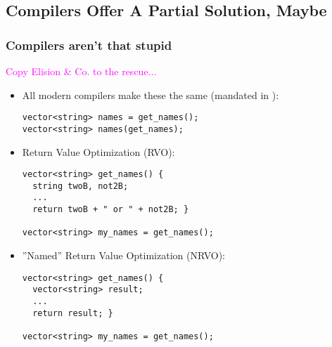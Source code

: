 
\subsection[Compiler != Solution]{Compilers Offer A Partial Solution, Maybe}\lyxframeend{}


\begin{frame}[fragile,t]
\frametitle{Compilers aren't that stupid}

{\textcolor{magenta}{Copy Elision \& Co. to the rescue...}}

\begin{itemize}
\item<2-> All modern compilers make these the same (mandated in  ):
{\scriptsize
\begin{verbatim}
vector<string> names = get_names();
vector<string> names(get_names);
\end{verbatim}}

\vskip 6pt

\item<3->Return Value Optimization (RVO):{\scriptsize
\begin{verbatim}
vector<string> get_names() {
  string twoB, not2B;
  ...
  return twoB + " or " + not2B; } 

vector<string> my_names = get_names();
\end{verbatim}}
\vskip 6pt
\item<4->''Named'' Return Value Optimization (NRVO):{\scriptsize
\begin{verbatim}
vector<string> get_names() {
  vector<string> result; 
  ... 
  return result; } 

vector<string> my_names = get_names();
\end{verbatim}}

\vskip 6pt


\end{itemize}


\end{frame}

